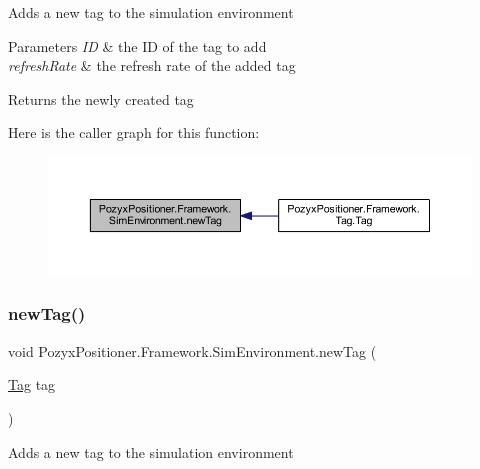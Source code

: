 Adds a new tag to the simulation environment 


\begin{DoxyParams}{Parameters}
{\em ID} & the ID of the tag to add\\
\hline
{\em refresh\+Rate} & the refresh rate of the added tag\\
\hline
\end{DoxyParams}
\begin{DoxyReturn}{Returns}
the newly created tag 
\end{DoxyReturn}
Here is the caller graph for this function\+:
\nopagebreak
\begin{figure}[H]
\begin{center}
\leavevmode
\includegraphics[width=350pt]{class_pozyx_positioner_1_1_framework_1_1_sim_environment_ad523ae9a258ae7b68d7f966be92ff3bb_icgraph}
\end{center}
\end{figure}
\mbox{\label{class_pozyx_positioner_1_1_framework_1_1_sim_environment_ae804be21b53900cbac13c0cce385b170}} 
\subsubsection{\texorpdfstring{new\+Tag()}{newTag()}\hspace{0.1cm}{\footnotesize\ttfamily [2/2]}}
{\footnotesize\ttfamily void Pozyx\+Positioner.\+Framework.\+Sim\+Environment.\+new\+Tag (\begin{DoxyParamCaption}\item[{\hyperlink{class_pozyx_positioner_1_1_framework_1_1_tag}{Tag}}]{tag }\end{DoxyParamCaption})}



Adds a new tag to the simulation environment 


